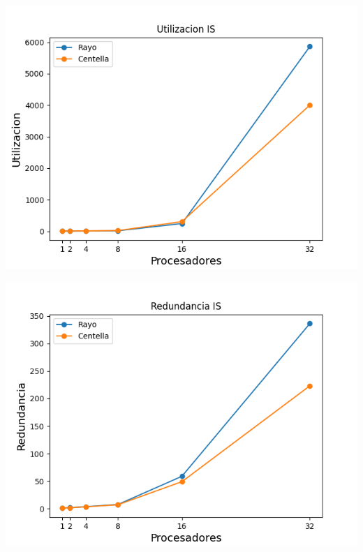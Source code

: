 \begin{center}
 \centering
  \begin{minipage}[b]{.49\textwidth}
  \includegraphics[width=1\linewidth]{plots/utilizacion-is.png}
 \end{minipage}
 \begin{minipage}[b]{.49\textwidth}
  \includegraphics[width=1\linewidth]{plots/redundancy-is.png}
 \end{minipage}
\end{center}

